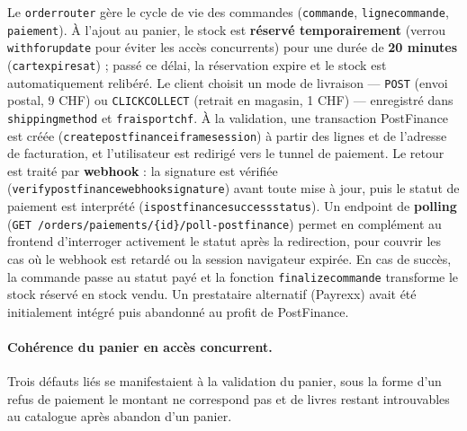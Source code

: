 \documentclass[12pt, a4paper]{report}
\renewcommand{\_}{\origunderscore\allowbreak}
\begin{document}
Le \texttt{order\_router} gère le cycle de vie des commandes (\texttt{commande}, \texttt{ligne\_commande}, \texttt{paiement}). À l'ajout au panier, le stock est \textbf{réservé temporairement} (verrou \texttt{with\_for\_update} pour éviter les accès concurrents) pour une durée de \textbf{20 minutes} (\texttt{cart\_expires\_at}) ; passé ce délai, la réservation expire et le stock est automatiquement relibéré. Le client choisit un mode de livraison — \texttt{POST} (envoi postal, 9 CHF) ou \texttt{CLICK\_COLLECT} (retrait en magasin, 1 CHF) — enregistré dans \texttt{shipping\_method} et \texttt{frais\_port\_chf}. À la validation, une transaction PostFinance est créée (\texttt{create\_postfinance\_iframe\_session}) à partir des lignes et de l'adresse de facturation, et l'utilisateur est redirigé vers le tunnel de paiement. Le retour est traité par \textbf{webhook} : la signature est vérifiée (\texttt{verify\_postfinance\_webhook\_signature}) avant toute mise à jour, puis le statut de paiement est interprété (\texttt{is\_postfinance\_success\_status}). Un endpoint de \textbf{polling} (\texttt{GET /orders/paiements/\{id\}/poll-postfinance}) permet en complément au frontend d'interroger activement le statut après la redirection, pour couvrir les cas où le webhook est retardé ou la session navigateur expirée. En cas de succès, la commande passe au statut payé et la fonction \texttt{\_finalize\_commande} transforme le stock réservé en stock vendu. Un prestataire alternatif (Payrexx) avait été initialement intégré puis abandonné au profit de PostFinance.

\paragraph{Cohérence du panier en accès concurrent.} Trois défauts liés se manifestaient à la validation du panier, sous la forme d'un refus de paiement \og le montant ne correspond pas \fg{} et de livres restant introuvables au catalogue après abandon d'un panier.
\end{document}
